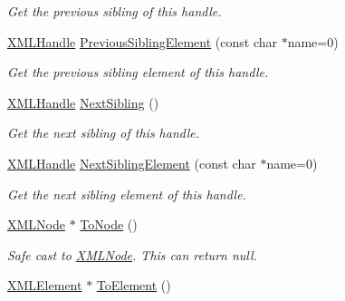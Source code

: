 \begin{DoxyCompactItemize}
\begin{DoxyCompactList}\small\item\em Get the previous sibling of this handle. \end{DoxyCompactList}\item 
\hypertarget{classtinyxml2_1_1_x_m_l_handle_a786957e498039554ed334cdc36612a7e}{}\hyperlink{classtinyxml2_1_1_x_m_l_handle}{X\+M\+L\+Handle} \hyperlink{classtinyxml2_1_1_x_m_l_handle_a786957e498039554ed334cdc36612a7e}{Previous\+Sibling\+Element} (const char $\ast$name=0)\label{classtinyxml2_1_1_x_m_l_handle_a786957e498039554ed334cdc36612a7e}

\begin{DoxyCompactList}\small\item\em Get the previous sibling element of this handle. \end{DoxyCompactList}\item 
\hypertarget{classtinyxml2_1_1_x_m_l_handle_aad2eccc7c7c7b18145877c978c3850b5}{}\hyperlink{classtinyxml2_1_1_x_m_l_handle}{X\+M\+L\+Handle} \hyperlink{classtinyxml2_1_1_x_m_l_handle_aad2eccc7c7c7b18145877c978c3850b5}{Next\+Sibling} ()\label{classtinyxml2_1_1_x_m_l_handle_aad2eccc7c7c7b18145877c978c3850b5}

\begin{DoxyCompactList}\small\item\em Get the next sibling of this handle. \end{DoxyCompactList}\item 
\hypertarget{classtinyxml2_1_1_x_m_l_handle_ae41d88ee061f3c49a081630ff753b2c5}{}\hyperlink{classtinyxml2_1_1_x_m_l_handle}{X\+M\+L\+Handle} \hyperlink{classtinyxml2_1_1_x_m_l_handle_ae41d88ee061f3c49a081630ff753b2c5}{Next\+Sibling\+Element} (const char $\ast$name=0)\label{classtinyxml2_1_1_x_m_l_handle_ae41d88ee061f3c49a081630ff753b2c5}

\begin{DoxyCompactList}\small\item\em Get the next sibling element of this handle. \end{DoxyCompactList}\item 
\hypertarget{classtinyxml2_1_1_x_m_l_handle_a03ea6ec970a021b71bf1219a0f6717df}{}\hyperlink{classtinyxml2_1_1_x_m_l_node}{X\+M\+L\+Node} $\ast$ \hyperlink{classtinyxml2_1_1_x_m_l_handle_a03ea6ec970a021b71bf1219a0f6717df}{To\+Node} ()\label{classtinyxml2_1_1_x_m_l_handle_a03ea6ec970a021b71bf1219a0f6717df}

\begin{DoxyCompactList}\small\item\em Safe cast to \hyperlink{classtinyxml2_1_1_x_m_l_node}{X\+M\+L\+Node}. This can return null. \end{DoxyCompactList}\item 
\hypertarget{classtinyxml2_1_1_x_m_l_handle_a5e73ed8f3f6f9619d5a8bb1862c47d99}{}\hyperlink{classtinyxml2_1_1_x_m_l_element}{X\+M\+L\+Element} $\ast$ \hyperlink{classtinyxml2_1_1_x_m_l_handle_a5e73ed8f3f6f9619d5a8bb1862c47d99}{To\+Element} ()\label{classtinyxml2_1_1_x_m_l_handle_a5e73ed8f3f6f9619d5a8bb1862c47d99}


\end{DoxyCompactItemize}
